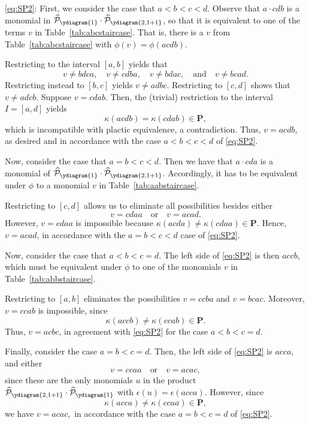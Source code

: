 \documentclass[12 pt]{amsart}
\newcommand{\Plactic}{{\mathbf{P}}}
\newcommand{\sFreeSchur}{\widehat{\mathcal{P}}}
\theoremstyle{remark}
\numberwithin{equation}{section}
\begin{document}
    \medbreak
   \eqref{eq:SP2}:
    First, we consider the case that $a <b <c <d$. Observe that $a\cdot cdb$ is a monomial in $\sFreeSchur_{\ydiagram{1}} \cdot \sFreeSchur_{\ydiagram{2,1+1}}$, so that it is equivalent to one of the terms $v$ in Table~\ref{tab:abcstaircase}. That is, there is a $v$ from Table~\ref{tab:abcstaircase} with $\phi(v)=\phi(acdb).$
    
    Restricting to the interval $[a,b]$ yields that
    \[
    v \neq bdca, \quad v \neq cdba, \quad v \neq bdac, \quad \text{and} \quad v\neq bcad.
    \]
    Restricting instead to $[b,c]$ yields $v\neq adbc$. Restricting to $[c,d]$ shows that $v \neq adcb$. 
    Suppose $v=cdab$. Then, the (trivial) restriction to the interval $I=[a,d]$ yields 
    \[
    \kappa(acdb) = \kappa(cdab) \in \Plactic,
    \] 
    which is incompatible with plactic equivalence, a contradiction.
    Thus, $v = acdb$, as desired and in accordance with the case $a<b<c<d$ of \eqref{eq:SP2}.

    Now, consider the case that $a=b<c < d$.
    Then we have that $a\cdot cda$ is a monomial of $\sFreeSchur_{\ydiagram{1}}\cdot \sFreeSchur_{\ydiagram{2,1+1}}$. Accordingly, it has to be equivalent under $\phi$ to a monomial $v$ in Table~\ref{tab:aabstaircase}.  
    
    Restricting to $[c,d]$ allows us to eliminate all possibilities besides either
    \[
        v = cdaa \quad \text{or} \quad v = acad.
    \]
    However, $v= cdaa$ is impossible because $\kappa(acda)\neq \kappa(cdaa) \in \Plactic$. Hence, $v = acad$, in accordance with the $a=b<c<d$ case of \eqref{eq:SP2}.

    Now, consider the case that $a<b<c = d$.
    The left side of \eqref{eq:SP2} is then $accb$, which must be equivalent under $\phi$ to one of the monomials $v$ in Table~\ref{tab:abbstaircase}.
    
    Restricting to $[a,b]$ eliminates the possibilities $v = ccb a$ and $v = bca c.$ Moreover, $v = ccab$ is impossible, since \[
\kappa(accb) \neq \kappa(ccab) \in \Plactic.
    \]
   Thus, $v = acb c$, in agreement with \eqref{eq:SP2} for the case $a<b<c = d$.
    
    Finally, consider the case $a=b<c = d$. Then, the left side of \eqref{eq:SP2} is $a cca$, and either
    \[v= cca  a \quad \text{or} \quad v= aca  c,\]
    since these are the only monomials $u$ in the product $\sFreeSchur_{\ydiagram{2,1+1}} \cdot \sFreeSchur_{\ydiagram{1}}$ with $\epsilon(u) = \epsilon(acca)$. 
    However, since 
    \[
    \kappa(acca) \neq \kappa(ccaa) \in \Plactic,
    \]
    we have
    $v= acac,$
    in accordance with the case $a=b<c = d$ of \eqref{eq:SP2}.
\end{document}
